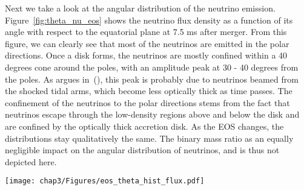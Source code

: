 Next we take a look at the angular distribution of the neutrino emission. Figure~\ref{fig:theta_nu_eos} shows the neutrino flux density as a function of its angle with respect to the equatorial plane at 7.5 ms after merger. From this figure, we can clearly see that most of the neutrinos are emitted in the polar directions. Once a disk forms, the neutrinos are mostly confined within a 40 degrees cone around the poles, with an amplitude peak at 30 - 40 degrees from the poles.
As argues in~(\citet*{foucart2016impact}), this peak is probably due to neutrinos beamed from the shocked tidal arms, which become less optically thick as time passes. The confinement of the neutrinos to the polar directions stems from the fact that neutrinos escape through the low-density regions above and below the disk and are confined by the optically thick accretion disk. As the EOS changes, the distributions stay qualitatively the same. The binary mass ratio as an equally negligible impact on the angular distribution of neutrinos, and is thus not depicted here.

\begin{figure*}[!htbp]
\centering \texttt{[image: chap3/Figures/eos\_theta\_hist\_flux.pdf]}
\caption{
  Neutrino flux density moment as a function of angle for different EOSs at 7.5ms post-merger. The angle is defined with respect to the equatorial plane with $0^\circ$ being the equator, and $\pm 90^\circ$ being the North and South poles. The different neutrino species are color coded.
}
\label{fig:theta_nu_eos}
\end{figure*}


